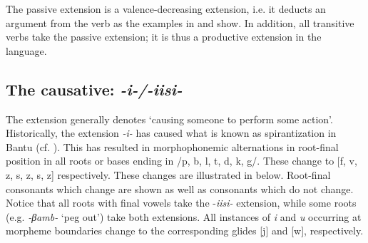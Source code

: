 \documentclass[output=paper		  ]{langscibook}
\begin{document}
{The passive extension is a valence-decreasing extension, i.e. it deducts an argument from the verb as the examples in  and  show. In addition, all transitive verbs take the passive extension; it is thus a productive extension in the language.} 

\subsection{The causative: \textit{{}-i-/-iisi-}}\label{sec:kahigi:2.3}

{The extension generally denotes ‘causing someone to perform some action’. Historically, the extension} {\textit{{}-i-} }{has caused what is known as spirantization in Bantu (cf. \citealt{Schadeberg1995, Bostoen2008}). This has resulted in morphophonemic alternations in root-final position in all roots or bases ending in /p, b, l, t, d, k, g/. These change to [f, v, z, s, z, s, z] respectively. These changes are illustrated in  below. Root-final consonants which change are shown as well as consonants which do not change. Notice that all roots with final vowels take the -}{\textit{iisi-}} {extension, while some roots (e.g.} {\textit{{}-βamb-}} {‘peg out’) take both extensions. All instances of} {\textit{i}} {and} {\textit{u}} {occurring at morpheme boundaries change to the corresponding glides [j] and [w], respectively.} 
\end{document}
